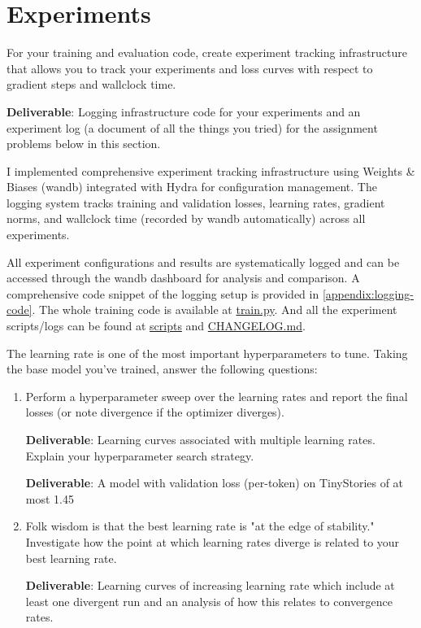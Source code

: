 \section{Experiments}


For your training and evaluation code, create experiment tracking infrastructure that allows you to track your experiments and loss curves with respect to gradient steps and wallclock time.

\textbf{Deliverable}: Logging infrastructure code for your experiments and an experiment log (a document of all the things you tried) for the assignment problems below in this section.

\begin{answer}
I implemented comprehensive experiment tracking infrastructure using Weights \& Biases (wandb) integrated with Hydra for configuration management. The logging system tracks training and validation losses, learning rates, gradient norms, and wallclock time (recorded by wandb automatically) across all experiments.

All experiment configurations and results are systematically logged and can be accessed through the wandb dashboard for analysis and comparison. A comprehensive code snippet of the logging setup is provided in \ref{appendix:logging-code}. The whole training code is available at \href{https://github.com/donglinkang2021/assignment1-basics/blob/main/train.py}{train.py}. And all the experiment scripts/logs can be found at \href{https://github.com/donglinkang2021/assignment1-basics/tree/main/scripts}{scripts} and \href{https://github.com/donglinkang2021/assignment1-basics/blob/main/docs/CHANGELOG.md}{CHANGELOG.md}.

\end{answer}


The learning rate is one of the most important hyperparameters to tune. Taking the base model you've trained, answer the following questions:

\begin{enumerate}[label=(\alph*)]
    \item Perform a hyperparameter sweep over the learning rates and report the final losses (or note divergence if the optimizer diverges).
    
    \textbf{Deliverable}: Learning curves associated with multiple learning rates. Explain your hyperparameter search strategy.
    
    \textbf{Deliverable}: A model with validation loss (per-token) on TinyStories of at most 1.45
    
    \item Folk wisdom is that the best learning rate is "at the edge of stability." Investigate how the point at which learning rates diverge is related to your best learning rate.
    
    \textbf{Deliverable}: Learning curves of increasing learning rate which include at least one divergent run and an analysis of how this relates to convergence rates.
\end{enumerate}


